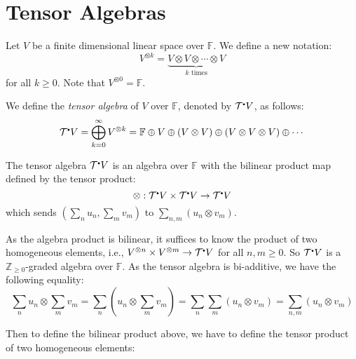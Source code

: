 \documentclass[
	11pt, %
	fleqn, %
	a4paper, %
]{LegrandOrangeBook}
\newcommand{\smallbullet}{\scalebox{0.5}{$\bullet$}}
\newcommand{\F}{\mathbb{F}} %
\newcommand{\T}{\mathcal{T}^{\smallbullet}} %
\begin{document}
\newpage

\section{Tensor Algebras}

Let $V$ be a finite dimensional linear space over $\F$. We define a new notation:
\[
    V^{\otimes k} = \underbrace{V \otimes V \otimes \cdots \otimes V}_{k \text{ times}}
\]
for all $k \geq 0$. Note that $V^{\otimes 0} = \F$.

We define the \emph{tensor algebra} of $V$ over $\F$, denoted by $\T V$, as follows:
\[
    \T V = \bigoplus_{k = 0}^{\infty} V^{\otimes k} = \F \oplus V \oplus (V \otimes V) \oplus (V \otimes V \otimes V) \oplus \cdots
\]

The tensor algebra $\T V$ is an algebra over $\F$ with the bilinear product map defined by the tensor product:
\[
    \otimes : \T V \times \T V \to \T V
\]
which sends $(\sum_n u_n, \sum_m v_m)$ to $\sum_{n, m} (u_n \otimes v_m)$.

\begin{remark}
    As the algebra product is bilinear, it suffices to know the product of two homogeneous elements, i.e., $V^{\otimes n} \times V^{\otimes m} \to \T V$ for all $n, m \geq 0$. So $\T V$ is a $\mathbb{Z}_{\geq 0}$-graded algebra over $\F$. As the tensor algebra is bi-additive, we have the following equality:
    \[
        \sum_n u_n \otimes \sum_m v_m = \sum_n (u_n \otimes \sum_m v_m) = \sum_n \sum_m (u_n \otimes v_m) = \sum_{n, m} (u_n \otimes v_m)
    \]
\end{remark}

Then to define the bilinear product above, we have to define the tensor product of two homogeneous elements:
\begin{center}
\end{center}
\end{document}
